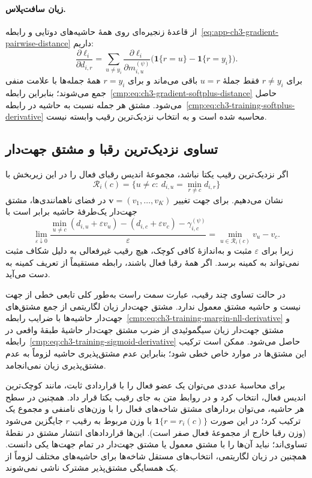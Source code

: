 \paragraph{زیان سافت‌پلاس.}
از قاعدهٔ زنجیره‌ای روی همهٔ حاشیه‌های دوتایی
و رابطه~\eqref{eq:app-ch3-gradient-pairwise-distance}
داریم:
\[
\frac{\partial\ell_i}{\partial d_{i,r}}
=\sum_{u\ne y_i}
\frac{\partial\ell_i}{\partial m_{i,u}^{(\psi)}}
\bigl(\mathbf1\{r=u\}-\mathbf1\{r=y_i\}\bigr).
\]
برای $r\ne y_i$ فقط جملهٔ $u=r$ باقی
می‌ماند و برای $r=y_i$ همهٔ جمله‌ها با علامت
منفی جمع می‌شوند؛ بنابراین
رابطه~\eqref{cmp:eq:ch3-gradient-softplus-distance}
حاصل می‌شود. مشتق هر جمله نسبت به حاشیه
در رابطه~\eqref{cmp:eq:ch3-training-softplus-derivative}
محاسبه شده است و به انتخاب نزدیک‌ترین رقیب
وابسته نیست.

\subsection{تساوی نزدیک‌ترین رقبا و مشتق جهت‌دار}
\label{app:ch3-gradient-loss-ties}

اگر نزدیک‌ترین رقیب یکتا نباشد، مجموعهٔ اندیس
رقبای فعال را در این زیربخش با
\[
\mathcal R_i(c)=
\{u\ne c:\ d_{i,u}=\min_{r\ne c}d_{i,r}\}
\]
نشان می‌دهیم. برای جهت تغییر
$\boldsymbol v=(v_1,\ldots,v_K)$ در فضای
ناهمانندی‌ها، مشتق جهت‌دار یک‌طرفهٔ حاشیه
برابر است با
\begin{equation}\label{eq:app-ch3-gradient-margin-directional}
\lim_{\varepsilon\downarrow0}
\frac{\min_{u\ne c}(d_{i,u}+\varepsilon v_u)
-(d_{i,c}+\varepsilon v_c)-\gamma_{i,c}^{(\psi)}}
{\varepsilon}
=\min_{u\in\mathcal R_i(c)}v_u-v_c.
\end{equation}
زیرا برای $\varepsilon$ مثبت و به‌اندازهٔ کافی
کوچک، هیچ رقیب غیرفعالی به دلیل شکاف مثبت
نمی‌تواند به کمینه برسد. اگر همهٔ رقبا فعال
باشند، رابطه مستقیماً از تعریف کمینه به دست
می‌آید.

در حالت تساوی چند رقیب، عبارت سمت راست
به‌طور کلی تابعی خطی از جهت نیست و حاشیه
مشتق معمول ندارد. مشتق جهت‌دار زیان لگاریتمی
از جمع مشتق‌های جهت‌دار حاشیه‌ها با ضرایب
رابطه~\eqref{cmp:eq:ch3-training-margin-nll-derivative}
و مشتق جهت‌دار زیان سیگموئیدی از ضرب مشتق
جهت‌دار حاشیهٔ طبقهٔ واقعی در
رابطه~\eqref{cmp:eq:ch3-training-sigmoid-derivative}
حاصل می‌شود. ممکن است ترکیب این مشتق‌ها در
موارد خاص خطی شود؛ بنابراین عدم مشتق‌پذیری
حاشیه لزوماً به عدم مشتق‌پذیری زیان نمی‌انجامد.

برای محاسبهٔ عددی می‌توان یک عضو فعال را
با قراردادی ثابت، مانند کوچک‌ترین اندیس فعال،
انتخاب کرد و در روابط متن به جای رقیب یکتا
قرار داد. همچنین در سطح هر حاشیه، می‌توان
بردارهای مشتق شاخه‌های فعال را با وزن‌های
نامنفی و مجموع یک ترکیب کرد؛ در این صورت
$\mathbf1\{r=r_i(c)\}$ با وزن مربوط به
رقیب $r$ جایگزین می‌شود (وزن رقبا خارج از
مجموعهٔ فعال صفر است).
این‌ها قراردادهای انتشار مشتق در نقطهٔ تساوی‌اند؛
نباید آن‌ها را با مشتق معمول یا مشتق جهت‌دار
در تمام جهت‌ها یکی دانست. همچنین در زیان
لگاریتمی، انتخاب‌های مستقل شاخه‌ها برای حاشیه‌های
مختلف لزوماً از یک همسایگی مشتق‌پذیر مشترک
ناشی نمی‌شوند.

